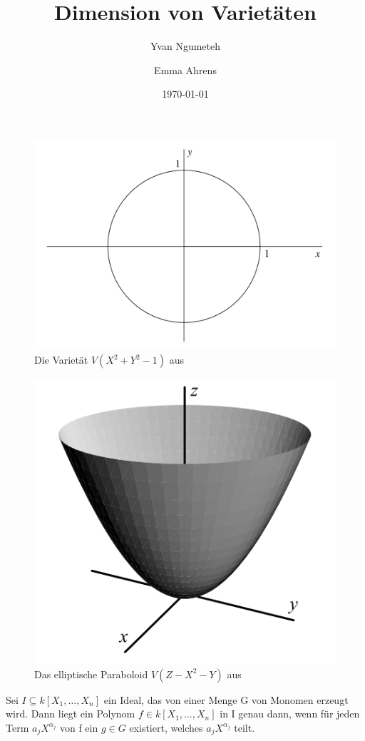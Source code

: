 \documentclass{beamer}
\title{Dimension von Varietäten}
\date{\today}
\author{Yvan Ngumeteh \and Emma Ahrens}
\newcommand*{\R}{k[X_{1},\ldots,X_{n}]}
\begin{document}
\begin{frame}
	\begin{figure}[ht]
		\centering
		\includegraphics[width=.75\linewidth]{circle.png}
		\caption{Die Varietät \(V(X^2 + Y^2 -1)\) aus \cite{CLOS}}
		\label{circle}
	\end{figure}
\end{frame}

\begin{frame}
	\begin{figure}[ht]
		\centering
		\includegraphics[width=.5\linewidth]{paraboloid.png}
		\caption{Das elliptische Paraboloid \(V(Z - X^2 -Y)\) aus \cite{CLOS}}
		\label{paraboloid}
	\end{figure}
\end{frame}

\begin{frame}
	\begin{lemma} \label{1.2.3}
	Sei \(I \subseteq \R\) ein Ideal, das von einer Menge G von Monomen erzeugt wird. Dann liegt
	ein Polynom \(f \in \R\) in I genau dann, wenn für jeden Term \(a_{j}X^{\alpha_{j}}\) von f ein
	\(g \in G\) existiert, welches \(a_{j}X^{\alpha_{j}}\) teilt.
	\end{lemma}
\end{frame}
\end{document}
